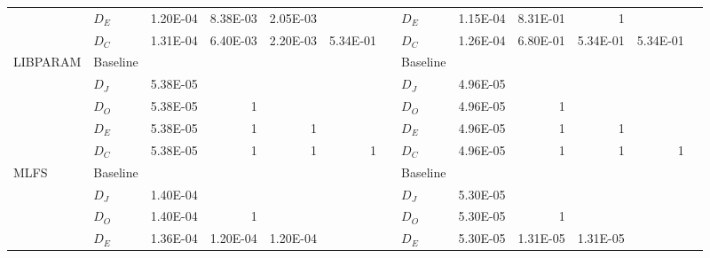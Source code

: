 \begin{table*}
\begin{tabular}{|l|l|lllll|l|lllll|}
           & $D_E$     & 1.20E-04 & 8.38E-03              & 2.05E-03              &          &      & $D_E$     & 1.15E-04 & 8.31E-01              & \multicolumn{1}{r}{1} &                       &       \\
           & $D_C$     & 1.31E-04 & 6.40E-03              & 2.20E-03              & 5.34E-01 &      & $D_C$     & 1.26E-04 & 6.80E-01              & 5.34E-01              & 5.34E-01              &       \\
\hline
LIBPARAM   & Baseline &          &                       &                       &          &      & Baseline &          &                       &                       &                       &       \\
           & $D_J$     & 5.38E-05 &                       &                       &          &      & $D_J$     & 4.96E-05 &                       &                       &                       &       \\
           & $D_O$     & 5.38E-05 & \multicolumn{1}{r}{1} &                       &          &      & $D_O$     & 4.96E-05 & \multicolumn{1}{r}{1} &                       &                       &       \\
           & $D_E$     & 5.38E-05 & \multicolumn{1}{r}{1} & \multicolumn{1}{r}{1} &          &      & $D_E$     & 4.96E-05 & \multicolumn{1}{r}{1} & \multicolumn{1}{r}{1} &                       &       \\
           & $D_C$     & 5.38E-05 & \multicolumn{1}{r}{1} & \multicolumn{1}{r}{1} &    \multicolumn{1}{r}{1}   &      & $D_C$     & 4.96E-05 & \multicolumn{1}{r}{1} & \multicolumn{1}{r}{1} & \multicolumn{1}{r}{1} &       \\
\hline
MLFS       & Baseline &          &                       &                       &          &      & Baseline &          &                       &                       &                       &       \\
           & $D_J$     & 1.40E-04 &                       &                       &          &      & $D_J$     & 5.30E-05 &                       &                       &                       &       \\
           & $D_O$     & 1.40E-04 & \multicolumn{1}{r}{1} &                       &          &      & $D_O$     & 5.30E-05 & \multicolumn{1}{r}{1} &                       &                       &       \\
           & $D_E$     & 1.36E-04 & 1.20E-04              & 1.20E-04              &          &      & $D_E$     & 5.30E-05 & 1.31E-05              & 1.31E-05              &                       &       \\

\end{tabular}
\end{table*}
